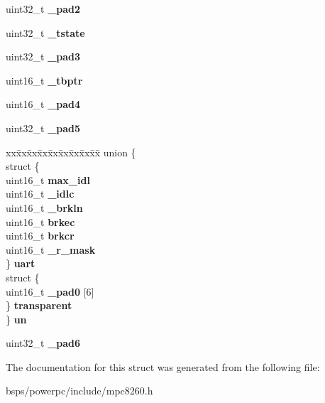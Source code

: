 \begin{DoxyCompactItemize}
\mbox{\label{structm8260SMCparms___acbd2038619ae429d39fef8a649b85c49}} 
uint32\+\_\+t {\bfseries \+\_\+pad2}
\item 
\mbox{\label{structm8260SMCparms___a48ac55de4190cdb517ab193ca41e60fb}} 
uint32\+\_\+t {\bfseries \+\_\+tstate}
\item 
\mbox{\label{structm8260SMCparms___a52fb20c0680c53ad3f90336ee4b0acb7}} 
uint32\+\_\+t {\bfseries \+\_\+pad3}
\item 
\mbox{\label{structm8260SMCparms___a29314b7a1402015e4acafdf0dac8b2b3}} 
uint16\+\_\+t {\bfseries \+\_\+tbptr}
\item 
\mbox{\label{structm8260SMCparms___aa38f5eab2ef279901e999326f886ec99}} 
uint16\+\_\+t {\bfseries \+\_\+pad4}
\item 
\mbox{\label{structm8260SMCparms___a9d9859eed1e7eba914568d0d25a8645f}} 
uint32\+\_\+t {\bfseries \+\_\+pad5}
\item 
\mbox{\label{structm8260SMCparms___a67adf8c01bc3548ed11609bac8cd4f27}} 
\begin{tabbing}
xx\=xx\=xx\=xx\=xx\=xx\=xx\=xx\=xx\=\kill
union \{\\
\>struct \{\\
\>\>uint16\_t {\bfseries max\_idl}\\
\>\>uint16\_t {\bfseries \_idlc}\\
\>\>uint16\_t {\bfseries \_brkln}\\
\>\>uint16\_t {\bfseries brkec}\\
\>\>uint16\_t {\bfseries brkcr}\\
\>\>uint16\_t {\bfseries \_r\_mask}\\
\>\} {\bfseries uart}\\
\>struct \{\\
\>\>uint16\_t {\bfseries \_pad0} \mbox{[}6\mbox{]}\\
\>\} {\bfseries transparent}\\
\} {\bfseries un}\\

\end{tabbing}\item 
\mbox{\label{structm8260SMCparms___a0658068ecaf47086f68df705aa45e3e0}} 
uint32\+\_\+t {\bfseries \+\_\+pad6}
\end{DoxyCompactItemize}


The documentation for this struct was generated from the following file\+:\begin{DoxyCompactItemize}
\item 
bsps/powerpc/include/mpc8260.\+h\end{DoxyCompactItemize}
